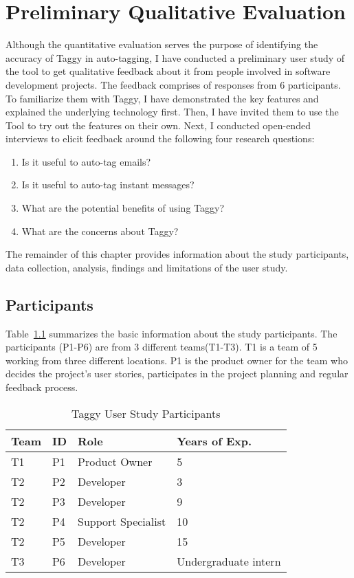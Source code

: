 \fancyhead[RO,LE]{\thepage}
\fancyfoot{} 
\chapter{Preliminary Qualitative Evaluation}
\label{ch:qualitative_evaluation}
Although the quantitative evaluation serves the purpose of identifying the accuracy of Taggy in auto-tagging, I have conducted a preliminary user study of the tool to get qualitative feedback about it from people involved in software development projects. The feedback comprises of responses from 6 participants. To familiarize them with Taggy, I have demonstrated the key features and explained the underlying technology first. Then, I have invited them to use the Tool to try out the features on their own. Next, I conducted open-ended interviews to elicit feedback around the following four research questions:

\begin{enumerate}
	\item Is it useful to auto-tag emails?
	\item Is it useful to auto-tag instant messages?
	\item What are the potential benefits of using Taggy?
	\item What are the concerns about Taggy?
\end{enumerate}

The remainder of this chapter provides information about the study participants, data collection, analysis, findings and limitations of the user study.

\section{Participants}
Table~\ref{tab:participants} summarizes the basic information about the study participants. The participants (P1-P6) are from 3 different teams(T1-T3). T1 is a team of 5 working from three different locations. P1 is the product owner for the team who decides the project's user stories, participates in the project planning and regular feedback process. 

\begin{table}
	\label{tab:participants}
  \centering
  \caption{Taggy User Study Participants}
    \begin{tabular}{|p{2cm}|p{2cm}|p{4cm}|p{4cm}|}
    \hline
		Team & ID & Role & Years of Exp.\\
		\hline
		T1	&  P1 & Product Owner & 5 \\
		T2	&  P2 & Developer & 3 \\
		T2	&  P3 & Developer & 9 \\
		T2	&  P4 & Support Specialist & 10 \\
		T2	&  P5 & Developer & 15\\		
		T3	&  P6 & Developer & Undergraduate intern\\		
		\hline
		\end{tabular}
\end{table}                                              

